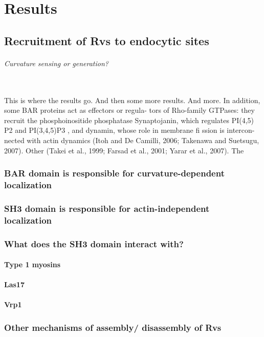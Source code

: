 \chapter{Results}    \label{results}
\section{Recruitment of Rvs to endocytic sites}

	\subparagraph{Curvature sensing or generation? }
	\mbox{}\\
	This is where the results go. And then some more results. And more.
In addition, some BAR proteins act as effectors or regula- tors of Rho-family GTPases: they recruit the phosphoinositide phosphatase Synaptojanin, which regulates PI(4,5) P2
and PI(3,4,5)P3 , and dynamin, whose
role in membrane fi ssion is intercon- nected with actin dynamics (Itoh and De Camilli, 2006; Takenawa and Suetsugu,
2007). Other
(Takei et al., 1999; Farsad et al., 2001; Yarar et al., 2007). The

	\subsection{BAR domain is responsible for curvature-dependent localization}
	\subsection{SH3 domain is responsible for actin-independent  \\
		localization}
	\subsection{What does the SH3 domain interact with?}
		\subsubsection{Type 1 myosins}
		\subsubsection{Las17}
		\subsubsection{Vrp1}

	\subsection{Other mechanisms of assembly/ disassembly of Rvs}		
